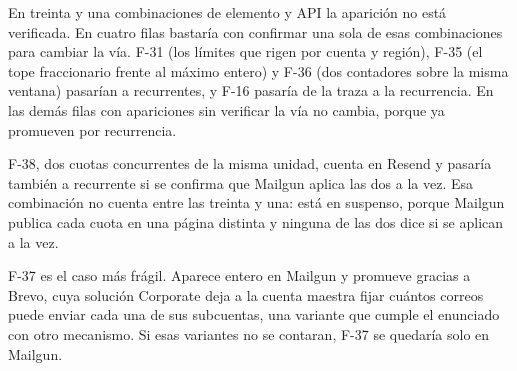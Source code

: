En treinta y una combinaciones de elemento y API la aparición no está verificada.
En cuatro filas bastaría con confirmar una sola de esas combinaciones para cambiar la vía.
F-31 (los límites que rigen por cuenta y región), F-35 (el tope fraccionario frente al máximo entero) y F-36 (dos contadores sobre la misma ventana) pasarían a recurrentes, y F-16 pasaría de la traza a la recurrencia.
En las demás filas con apariciones sin verificar la vía no cambia, porque ya promueven por recurrencia.

F-38, dos cuotas concurrentes de la misma unidad, cuenta en Resend y pasaría también a recurrente si se confirma que Mailgun aplica las dos a la vez.
Esa combinación no cuenta entre las treinta y una: está en suspenso, porque Mailgun publica cada cuota en una página distinta y ninguna de las dos dice si se aplican a la vez.

F-37 es el caso más frágil.
Aparece entero en Mailgun y promueve gracias a Brevo, cuya solución Corporate deja a la cuenta maestra fijar cuántos correos puede enviar cada una de sus subcuentas, una variante que cumple el enunciado con otro mecanismo.
Si esas variantes no se contaran, F-37 se quedaría solo en Mailgun.
